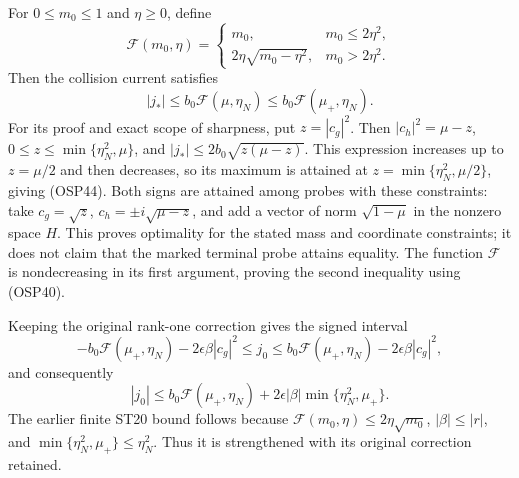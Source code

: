 \documentclass[
]{article}
\begin{document}
For \(0\le m_0\le1\) and \(\eta\ge0\), define \[
\mathcal F(m_0,\eta)=
\begin{cases}
m_0,&m_0\le2\eta^2,\\
2\eta\sqrt{m_0-\eta^2},&m_0>2\eta^2.
\end{cases}
\tag{OSP44}
\] Then the collision current satisfies \[
|j_*|\le b_0\mathcal F(\mu,\eta_N)
\le b_0\mathcal F(\mu_+,\eta_N).
\tag{OSP45}
\] For its proof and exact scope of sharpness, put \(z=|c_g|^2\). Then
\(|c_h|^2=\mu-z\), \(0\le z\le\min\{\eta_N^2,\mu\}\), and
\(|j_*|\le2b_0\sqrt{z(\mu-z)}\). This expression increases up to
\(z=\mu/2\) and then decreases, so its maximum is attained at
\(z=\min\{\eta_N^2,\mu/2\}\), giving (OSP44). Both signs are attained
among probes with these constraints: take \(c_g=\sqrt z\),
\(c_h=\pm i\sqrt{\mu-z}\), and add a vector of norm \(\sqrt{1-\mu}\) in
the nonzero space \(H\). This proves optimality for the stated mass and
coordinate constraints; it does not claim that the marked terminal probe
attains equality. The function \(\mathcal F\) is nondecreasing in its
first argument, proving the second inequality using (OSP40).

Keeping the original rank-one correction gives the signed interval \[
-b_0\mathcal F(\mu_+,\eta_N)-2\epsilon\beta|c_g|^2
\le j_0\le
b_0\mathcal F(\mu_+,\eta_N)-2\epsilon\beta|c_g|^2,
\tag{OSP46}
\] and consequently \[
|j_0|\le b_0\mathcal F(\mu_+,\eta_N)
+2\epsilon|\beta|\min\{\eta_N^2,\mu_+\}.
\tag{OSP47}
\] The earlier finite ST20 bound follows because
\(\mathcal F(m_0,\eta)\le2\eta\sqrt{m_0}\), \(|\beta|\le|r|\), and
\(\min\{\eta_N^2,\mu_+\}\le\eta_N^2\). Thus it is strengthened with its
original correction retained.
\end{document}
